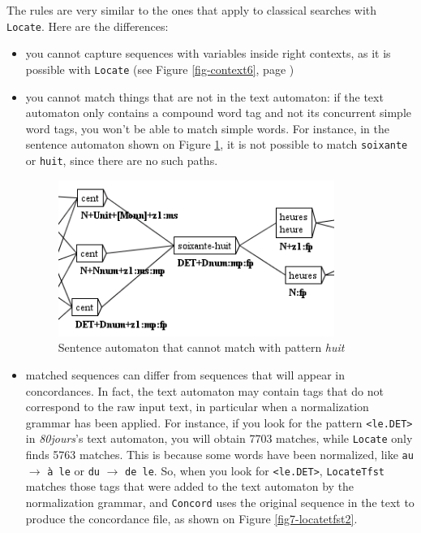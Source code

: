  
\bigskip
\noindent The rules are very similar to the ones that apply to classical
searches with \verb+Locate+. Here are the differences:

\begin{itemize}
    \item you cannot capture sequences with variables inside right contexts, as
    it is possible with \verb+Locate+ (see Figure \ref{fig-context6},
    page \pageref{fig-context6})
    
    \item you cannot match things that are not in the text automaton: 
    if the text automaton only contains a compound word tag and not
    its concurrent simple word tags, you won't be able to match simple words.
    For instance, in the sentence automaton shown on Figure
    \ref{fig7-locatetfst1}, it is not possible to match \verb+soixante+
    or \verb+huit+, since there are no such paths.
    
\begin{figure}[!ht]
\begin{center}
\includegraphics[width=9cm]{resources/img/fig7-locatetfst1.png}
\caption{Sentence automaton that cannot match with
pattern \textit{huit}\label{fig7-locatetfst1}}
\end{center}
\end{figure}

    \item matched sequences can differ from sequences that will appear in
    concordances. In fact, the text automaton may contain tags that do not
    correspond to the raw input text, in particular when a normalization grammar
    has been applied. For instance, if you look for the pattern \verb+<le.DET>+
    in \textit{80jours}'s text automaton, you will obtain 7703 matches, while
    \verb+Locate+ only finds 5763 matches. This is because some words have been normalized,
    like \verb+au+ $\rightarrow$ \texttt{\`a le} or \verb+du+ $\rightarrow$
    \verb+de le+. So, when you look for \verb+<le.DET>+, \verb+LocateTfst+
    matches those tags that were added to the text automaton by the
    normalization grammar, and \verb+Concord+ uses the original sequence in the
    text to produce the concordance file, as shown on Figure
    \ref{fig7-locatetfst2}.


\end{itemize}
